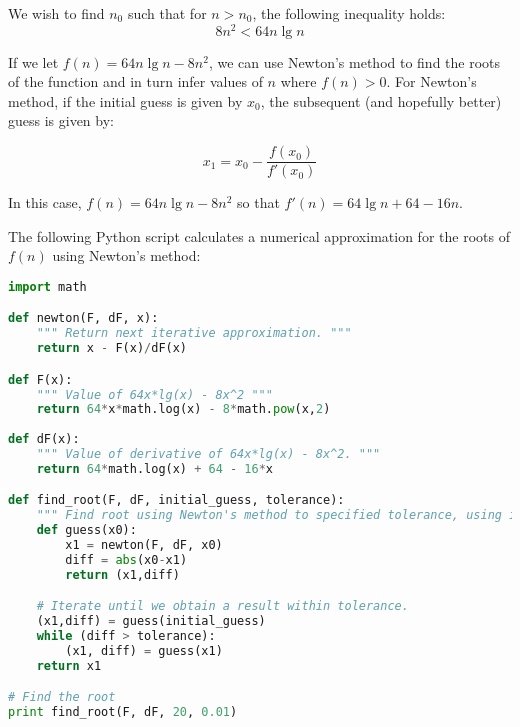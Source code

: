 \documentclass[a4paper,12pt]{article}
\begin{document}

We wish to find $n_0$ such that for $n > n_0$, the following inequality holds:
\[ 8n^2 < 64n \lg n\]

If we let $f(n) = 64n \lg n - 8n^2$, we can use Newton's method to find the roots 
of the function and in turn infer values of $n$ where $f(n) > 0$. For Newton's 
method, if the initial guess is given by $x_0$, the subsequent (and hopefully better) 
guess is given by:

\[ x_1 = x_0 - \frac{f(x_0)}{f'(x_0)} \]

In this case, $f(n) = 64n \lg n - 8n^2$ so that $f'(n) = 64\lg n + 64- 16n$. 

The following Python script calculates a numerical 
approximation for the roots of $f(n)$ using Newton's method:

\begin{lstlisting}[language=Python]
import math

def newton(F, dF, x):
    """ Return next iterative approximation. """
    return x - F(x)/dF(x)

def F(x):
    """ Value of 64x*lg(x) - 8x^2 """
    return 64*x*math.log(x) - 8*math.pow(x,2)
    
def dF(x):
    """ Value of derivative of 64x*lg(x) - 8x^2. """
    return 64*math.log(x) + 64 - 16*x

def find_root(F, dF, initial_guess, tolerance):
    """ Find root using Newton's method to specified tolerance, using initial guess. """
    def guess(x0):
        x1 = newton(F, dF, x0)
        diff = abs(x0-x1)
        return (x1,diff)

    # Iterate until we obtain a result within tolerance.                                                   
    (x1,diff) = guess(initial_guess)
    while (diff > tolerance):
        (x1, diff) = guess(x1)
    return x1

# Find the root                                                                                            
print find_root(F, dF, 20, 0.01)
\end{lstlisting}
\end{document}
